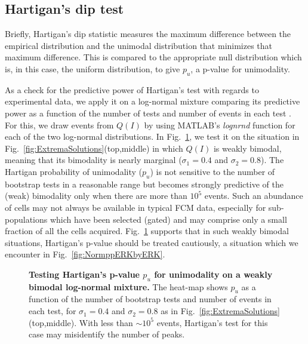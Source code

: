 \documentclass[11pt,a4paper,draft]{article}
\begin{document}
\subsection*{Hartigan's dip test}
Briefly, Hartigan's dip statistic measures the maximum difference between the empirical distribution and the unimodal distribution that minimizes that maximum difference. This is compared to the appropriate null distribution which is, in this case, the uniform distribution, to give $p_u$, a p-value for unimodality.

As a check for the predictive power of Hartigan's test with regards to experimental data, we apply it on a log-normal mixture comparing its predictive power as a function of the number of tests and number of events in each test \cite{NicPrice}. For this, we draw events from $Q(I)$ by using MATLAB's \emph{lognrnd} function for each of the two log-normal distributions. In Fig.~\ref{fig:CheckHartigan}, we test it on the situation in Fig.~\ref{fig:ExtremaSolutions}(top,middle) in which $Q(I)$ is weakly bimodal, meaning that its bimodality is nearly marginal ($\sigma_1=0.4$ and $\sigma_2=0.8$). The Hartigan probability of unimodality ($p_u$) is not sensitive to the number of bootstrap tests in a reasonable range but becomes strongly predictive of the (weak) bimodality only when there are more than $10^5$ events. Such an abundance of cells may not always be available in typical FCM data, especially for sub-populations which have been selected (gated) and may comprise only a small fraction of all the cells acquired. Fig.~\ref{fig:CheckHartigan} supports that in such weakly bimodal situations, Hartigan's p-value should be treated cautiously, a situation which we encounter in Fig.~\ref{fig:NormppERKbyERK}. \smallskip

\begin{figure}[!ht]
 \centering
  \caption{\textbf{Testing Hartigan's p-value $p_u$ for unimodality on a weakly bimodal log-normal mixture.} The heat-map shows $p_u$ as a function of the number of bootstrap tests and number of events in each test, for $\sigma_1=0.4$ and $\sigma_2=0.8$ as in Fig.~\ref{fig:ExtremaSolutions}(top,middle). With less than $\sim10^5$ events, Hartigan's test for this case may misidentify the number of peaks.}
  \label{fig:CheckHartigan}
\end{figure}

\end{document}
